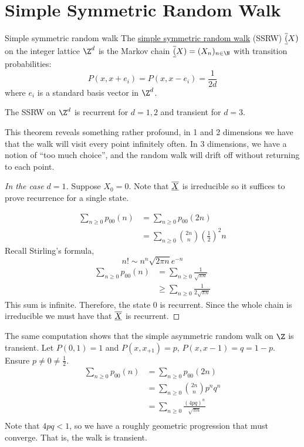 \documentclass[../Main.tex]{subfiles}
\begin{document}
\section{Simple Symmetric Random Walk}
\begin{definition}{Simple symmetric random walk}
    The \underline{simple symmetric random walk} (SSRW) $\underline{\overline{(}}X)$ on the integer lattice $\Z^d$ is the Markov chain $\chain(X) = (X_n)_{n \in \N}$ with transition probabilities:
    \begin{equation*}
        P(x, x + e_i) = P(x, x - e_i) = \frac{1}{2d}
    \end{equation*}
    where $e_i$ is a standard basis vector in $\Z^d$.
\end{definition}
\begin{theorem}
    The SSRW on $\Z^d$ is recurrent for $d = 1, 2$ and transient for $d = 3$.
    \label{thmSSRWRecurr}
\end{theorem}
\begin{remark}
    This theorem reveals something rather profound, in 1 and 2 dimensions we have that the walk will visit every point infinitely often. In 3 dimensions, we have a notion of ``too much choice'', and the random walk will drift off without returning to each point.
\end{remark}
\begin{proof}[In the case $d = 1$]
    Suppose $X_0 = 0$. Note that $\underline{\overline{X}}$ is irreducible so it suffices to prove recurrence for a single state.

    \begin{align*}
        \sum_{n \geq 0} p_{00}(n) &= \sum_{n \geq 0} p_{00}(2n) \\
        &= \sum_{n \geq 0} \binom{2n}{n} \left(\frac{1}{2}\right)^2n
    \end{align*}
    Recall Stirling's formula,
    \begin{equation*}
        n! \sim n^n \sqrt{2\pi n} e^{-n}  
    \end{equation*}
    \begin{align*}
        \sum_{n \geq 0} p_{00}(n) &= \sum_{n \geq 0} \frac{1}{\sqrt{\pi n}} \\
        &\geq \sum_{n \geq 0} \frac{1}{2\sqrt{\pi n}}
    \end{align*}
    This sum is infinite. Therefore, the state $0$ is recurrent. Since the whole chain is irreducible we must have that $\underline{\overline{X}}$ is recurrent.
\end{proof}
\begin{remark}
    The same computation shows that the simple asymmetric random walk on $\Z$ is transient. Let $P(0, 1) = 1$ and $P(x, x_{+1}) = p$, $P(x, x-1) = q = 1-p$. Ensure $p \neq 0 \neq \frac12$.
    \begin{align*}
        \sum_{n\geq 0}p_{00}(n)&= \sum_{n\geq 0} p_{00}(2n) \\
        &= \sum_{n \geq 0} \binom{2n}{n} p^n q^n \\
        &= \sum_{n \geq 0} \frac{(4pq)^n}{\sqrt{\pi n}} \\
    \end{align*}
    Note that $4pq < 1$, so we have a roughly geometric progression that must converge. That is, the walk is transient.
\end{remark}
\end{document}
